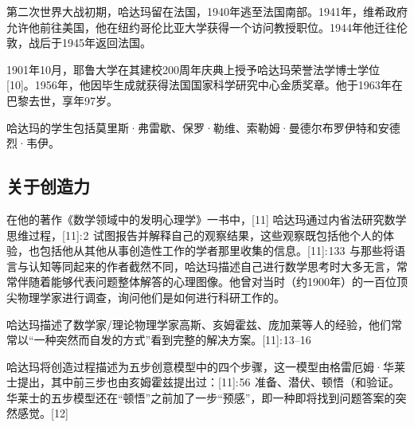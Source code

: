 第二次世界大战初期，哈达玛留在法国，1940年逃至法国南部。1941年，维希政府允许他前往美国，他在纽约哥伦比亚大学获得一个访问教授职位。1944年他迁往伦敦，战后于1945年返回法国。

1901年10月，耶鲁大学在其建校200周年庆典上授予哈达玛荣誉法学博士学位[10]。1956年，他因毕生成就获得法国国家科学研究中心金质奖章。他于1963年在巴黎去世，享年97岁。

哈达玛的学生包括莫里斯·弗雷歇、保罗·勒维、索勒姆·曼德尔布罗伊特和安德烈·韦伊。
\subsection{关于创造力}
在他的著作《数学领域中的发明心理学》一书中，[11] 哈达玛通过内省法研究数学思维过程，[11]: 2  试图报告并解释自己的观察结果，这些观察既包括他个人的体验，也包括他从其他从事创造性工作的学者那里收集的信息。[11]: 133  与那些将语言与认知等同起来的作者截然不同，哈达玛描述自己进行数学思考时大多无言，常常伴随着能够代表问题整体解答的心理图像。他曾对当时（约1900年）的一百位顶尖物理学家进行调查，询问他们是如何进行科研工作的。

哈达玛描述了数学家/理论物理学家高斯、亥姆霍兹、庞加莱等人的经验，他们常常以“一种突然而自发的方式”看到完整的解决方案。[11]: 13–16 

哈达玛将创造过程描述为五步创意模型中的四个步骤，这一模型由格雷厄姆·华莱士提出，其中前三步也由亥姆霍兹提出过：[11]: 56  准备、潜伏、顿悟（和验证。华莱士的五步模型还在“顿悟”之前加了一步“预感”，即一种即将找到问题答案的突然感觉。[12]

